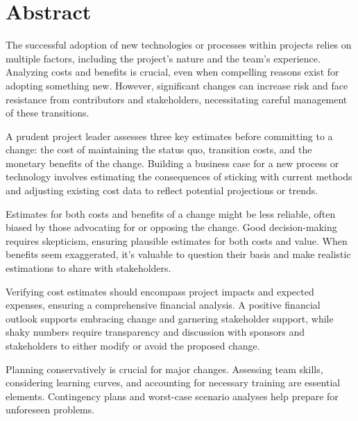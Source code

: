 \documentclass[11pt,letterpaper]{report}
\begin{document}
\titleformat{\chapter}{\bf\huge}{\thechapter}{20pt}{\huge\vspace{-.5em}}

\tableofcontents



\chapter{Abstract}

    The successful adoption of new technologies or processes within projects relies on multiple factors, including the project's nature and the team's experience. Analyzing costs and benefits is crucial, even when compelling reasons exist for adopting something new. However, significant changes can increase risk and face resistance from contributors and stakeholders, necessitating careful management of these transitions.

A prudent project leader assesses three key estimates before committing to a change: the cost of maintaining the status quo, transition costs, and the monetary benefits of the change. Building a business case for a new process or technology involves estimating the consequences of sticking with current methods and adjusting existing cost data to reflect potential projections or trends.

Estimates for both costs and benefits of a change might be less reliable, often biased by those advocating for or opposing the change. Good decision-making requires skepticism, ensuring plausible estimates for both costs and value. When benefits seem exaggerated, it's valuable to question their basis and make realistic estimations to share with stakeholders.

Verifying cost estimates should encompass project impacts and expected expenses, ensuring a comprehensive financial analysis. A positive financial outlook supports embracing change and garnering stakeholder support, while shaky numbers require transparency and discussion with sponsors and stakeholders to either modify or avoid the proposed change.

Planning conservatively is crucial for major changes. Assessing team skills, considering learning curves, and accounting for necessary training are essential elements. Contingency plans and worst-case scenario analyses help prepare for unforeseen problems.
\end{document}
